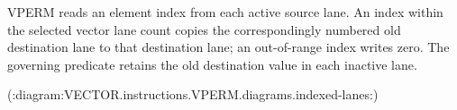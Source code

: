 VPERM reads an element index from each active source lane.  An index within the
selected vector lane count copies the correspondingly numbered old destination
lane to that destination lane; an out-of-range index writes zero.  The
governing predicate retains the old destination value in each inactive lane.

(:diagram:VECTOR.instructions.VPERM.diagrams.indexed-lanes:)
